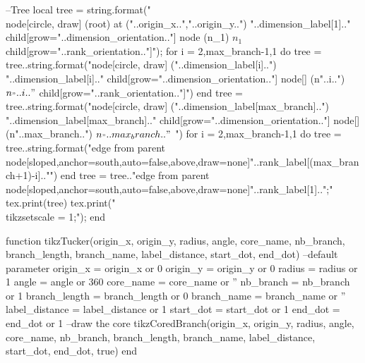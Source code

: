 \begin{luacode*}
	  --Tree
	  local tree = string.format("\\node[circle, draw] (root) at ("..origin_x..","..origin_y..") {"..dimension_label[1].."} child[grow="..dimension_orientation.."] {node (n_1) {$n_1$}} child[grow="..rank_orientation.."]{");
	  for i = 2,max_branch-1,1 do
		tree = tree..string.format("node[circle, draw] ("..dimension_label[i]..") {"..dimension_label[i].."} child[grow="..dimension_orientation.."] {node[] (n"..i..") {$n_"..i.."$}} child[grow="..rank_orientation.."]{")
	  end
	  tree = tree..string.format("node[circle, draw] ("..dimension_label[max_branch]..") {"..dimension_label[max_branch].."} child[grow="..dimension_orientation.."] {node[] (n"..max_branch..") {$n_"..max_branch.."$} }")
	  for i = 2,max_branch-1,1 do
		tree = tree..string.format("edge from parent node[sloped,anchor=south,auto=false,above,draw=none]{"..rank_label[(max_branch+1)-i].."}}")
	  end
	  tree = tree.."edge from parent node[sloped,anchor=south,auto=false,above,draw=none]{"..rank_label[1].."}};"
	  tex.print(tree)
	  tex.print("\\tikzset{scale = 1};");
	end
	
	function tikzTucker(origin_x, origin_y, radius, angle, core_name, nb_branch, branch_length, branch_name, label_distance, start_dot, end_dot)
	--default parameter
	  origin_x = origin_x or 0
	  origin_y = origin_y or 0
	  radius = radius or 1
	  angle = angle or 360
	  core_name = core_name or ''
	  nb_branch = nb_branch or 1
	  branch_length = branch_length or 0
	  branch_name = branch_name or ''
	  label_distance = label_distance or 1
	  start_dot = start_dot or 1
	  end_dot = end_dot or 1
	  --draw the core
	  tikzCoredBranch(origin_x, origin_y, radius, angle, core_name, nb_branch, branch_length, branch_name, label_distance, start_dot, end_dot, true)
	end
  \end{luacode*}
  